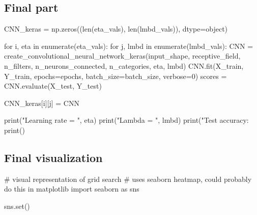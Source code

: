 \documentclass[%
oneside,                 %
final,                   %
10pt]{article}
\begin{document}
\epycod


\subsection{Final part}


















\bpycod
CNN_keras = np.zeros((len(eta_vals), len(lmbd_vals)), dtype=object)
        
for i, eta in enumerate(eta_vals):
    for j, lmbd in enumerate(lmbd_vals):
        CNN = create_convolutional_neural_network_keras(input_shape, receptive_field,
                                              n_filters, n_neurons_connected, n_categories,
                                              eta, lmbd)
        CNN.fit(X_train, Y_train, epochs=epochs, batch_size=batch_size, verbose=0)
        scores = CNN.evaluate(X_test, Y_test)
        
        CNN_keras[i][j] = CNN
        
        print("Learning rate = ", eta)
        print("Lambda = ", lmbd)
        print("Test accuracy: %
        print()

\epycod


\subsection{Final visualization}
































\bpycod
# visual representation of grid search
# uses seaborn heatmap, could probably do this in matplotlib
import seaborn as sns

sns.set()
\end{document}
